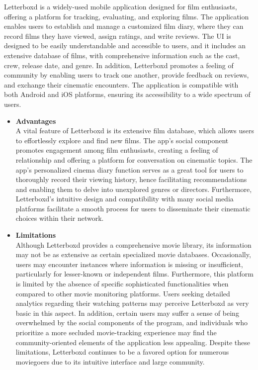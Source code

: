 Letterboxd is a widely-used mobile application designed for film enthusiasts, offering a platform for tracking, evaluating, and exploring films. The application enables users to establish and manage a customized film diary, where they can record films they have viewed, assign ratings, and write reviews. The UI is designed to be easily understandable and accessible to users, and it includes an extensive database of films, with comprehensive information such as the cast, crew, release date, and genre. In addition, Letterboxd promotes a feeling of community by enabling users to track one another, provide feedback on reviews, and exchange their cinematic encounters. The application is compatible with both Android and iOS platforms, ensuring its accessibility to a wide spectrum of users. \pagebreak
\begin{itemize}[\label{}]
    \item \textbf{Advantages} \\
    A vital feature of Letterboxd is its extensive film database, which allows users to effortlessly explore and find new films. The app's social component promotes engagement among film enthusiasts, creating a feeling of relationship and offering a platform for conversation on cinematic topics. The app's personalized cinema diary function serves as a great tool for users to thoroughly record their viewing history, hence facilitating recommendations and enabling them to delve into unexplored genres or directors. Furthermore, Letterboxd's intuitive design and compatibility with many social media platforms facilitate a smooth process for users to disseminate their cinematic choices within their network.
    \item \textbf{Limitations} \\
    Although Letterboxd provides a comprehensive movie library, its information may not be as extensive as certain specialized movie databases. Occasionally, users may encounter instances where information is missing or insufficient, particularly for lesser-known or independent films. Furthermore, this platform is limited by the absence of specific sophisticated functionalities when compared to other movie monitoring platforms. Users seeking detailed analytics regarding their watching patterns may perceive Letterboxd as very basic in this aspect. In addition, certain users may suffer a sense of being overwhelmed by the social components of the program, and individuals who prioritize a more secluded movie-tracking experience may find the community-oriented elements of the application less appealing. Despite these limitations, Letterboxd continues to be a favored option for numerous moviegoers due to its intuitive interface and large community.
\end{itemize}
\pagebreak

